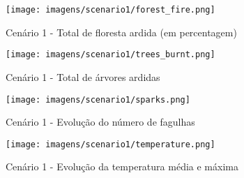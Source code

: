 \begin{figure}[H]
    \texttt{[image: imagens/scenario1/forest\_fire.png]}
    \caption{Cenário 1 - Total de floresta ardida (em percentagem)}
    \label{fig:S1ForestBurnt}        
\end{figure}
    
\begin{figure}[H]
    \centering
    \texttt{[image: imagens/scenario1/trees\_burnt.png]}
    \caption{Cenário 1 - Total de árvores ardidas}
    \label{fig:S1TreesBurnt}
\end{figure}

\begin{figure}[H]
    \centering
    \texttt{[image: imagens/scenario1/sparks.png]}
    \caption{Cenário 1 - Evolução do número de fagulhas}
    \label{fig:S1Sparks}
\end{figure}

\begin{figure}[H]
    \centering
    \texttt{[image: imagens/scenario1/temperature.png]}
    \caption{Cenário 1 - Evolução da temperatura média e máxima}
    \label{fig:S1Temp}
\end{figure}